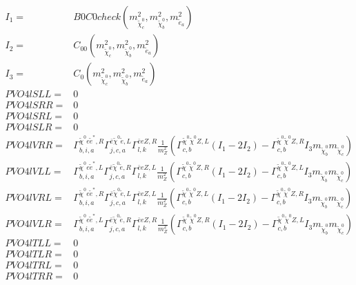 \documentclass[A4,landscape]{article}
\begin{document}
\begin{align} 
I_1= & B0C0check(m^2_{\tilde{\chi}^0_{{c}}}, m^2_{\tilde{\chi}^0_{{b}}}, m^2_{\tilde{e}_{{a}}}) \\ 
I_2= & C_{00}(m^2_{\tilde{\chi}^0_{{c}}}, m^2_{\tilde{\chi}^0_{{b}}}, m^2_{\tilde{e}_{{a}}}) \\ 
I_3= & C_0(m^2_{\tilde{\chi}^0_{{c}}}, m^2_{\tilde{\chi}^0_{{b}}}, m^2_{\tilde{e}_{{a}}}) \\ 
  PVO4lSLL= & 0 \\ 
  PVO4lSRR= & 0 \\ 
  PVO4lSRL= & 0 \\ 
  PVO4lSLR= & 0 \\ 
  PVO4lVRR= &  \Gamma^{\tilde{\chi}^0 e \tilde{e}^*,R}_{b, i, a} \Gamma^{\bar{e}\tilde{\chi}^0 \tilde{e} ,L}_{j, c, a} \Gamma^{\bar{e}e Z ,R}_{l, k} \frac{1}{m^2_{Z}} (\Gamma^{\tilde{\chi}^0 \tilde{\chi}^0 Z ,L}_{c, b} (I_1 - 2 I_2) - \Gamma^{\tilde{\chi}^0 \tilde{\chi}^0 Z ,R}_{c, b} I_3 m_{\tilde{\chi}^0_{{b}}} m_{\tilde{\chi}^0_{{c}}}) \\ 
  PVO4lVLL= &  \Gamma^{\tilde{\chi}^0 e \tilde{e}^*,L}_{b, i, a} \Gamma^{\bar{e}\tilde{\chi}^0 \tilde{e} ,R}_{j, c, a} \Gamma^{\bar{e}e Z ,L}_{l, k} \frac{1}{m^2_{Z}} (\Gamma^{\tilde{\chi}^0 \tilde{\chi}^0 Z ,R}_{c, b} (I_1 - 2 I_2) - \Gamma^{\tilde{\chi}^0 \tilde{\chi}^0 Z ,L}_{c, b} I_3 m_{\tilde{\chi}^0_{{b}}} m_{\tilde{\chi}^0_{{c}}}) \\ 
  PVO4lVRL= &  \Gamma^{\tilde{\chi}^0 e \tilde{e}^*,R}_{b, i, a} \Gamma^{\bar{e}\tilde{\chi}^0 \tilde{e} ,L}_{j, c, a} \Gamma^{\bar{e}e Z ,L}_{l, k} \frac{1}{m^2_{Z}} (\Gamma^{\tilde{\chi}^0 \tilde{\chi}^0 Z ,L}_{c, b} (I_1 - 2 I_2) - \Gamma^{\tilde{\chi}^0 \tilde{\chi}^0 Z ,R}_{c, b} I_3 m_{\tilde{\chi}^0_{{b}}} m_{\tilde{\chi}^0_{{c}}}) \\ 
  PVO4lVLR= &  \Gamma^{\tilde{\chi}^0 e \tilde{e}^*,L}_{b, i, a} \Gamma^{\bar{e}\tilde{\chi}^0 \tilde{e} ,R}_{j, c, a} \Gamma^{\bar{e}e Z ,R}_{l, k} \frac{1}{m^2_{Z}} (\Gamma^{\tilde{\chi}^0 \tilde{\chi}^0 Z ,R}_{c, b} (I_1 - 2 I_2) - \Gamma^{\tilde{\chi}^0 \tilde{\chi}^0 Z ,L}_{c, b} I_3 m_{\tilde{\chi}^0_{{b}}} m_{\tilde{\chi}^0_{{c}}}) \\ 
  PVO4lTLL= & 0 \\ 
  PVO4lTLR= & 0 \\ 
  PVO4lTRL= & 0 \\ 
  PVO4lTRR= & 0 \\ 
\end{align} 
\end{document}
